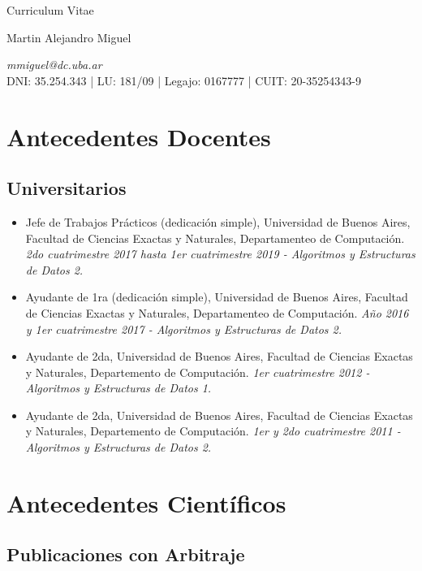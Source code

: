 \documentclass[a4paper,10pt]{article}
\begin{document}
\begin{center}
    { \Huge
    Curriculum Vitae}
\bigskip

{\Large Martin Alejandro Miguel} \\
\medskip

\emph{mmiguel@dc.uba.ar} \\
DNI: 35.254.343 | LU: 181/09 | Legajo: 0167777 | CUIT: 20-35254343-9
\end{center}


\section{Antecedentes Docentes}

\subsection{Universitarios}

\begin{itemize}
    \item Jefe de Trabajos Prácticos (dedicación simple), Universidad de Buenos
        Aires, Facultad de Ciencias Exactas y Naturales, Departamenteo de
        Computación. \emph{2do cuatrimestre 2017 hasta 1er cuatrimestre 2019 -
        Algoritmos y Estructuras de Datos 2.}
    \item Ayudante de 1ra (dedicación simple), Universidad de Buenos Aires,
        Facultad de Ciencias Exactas y Naturales, Departamenteo de Computación.
        \emph{Año 2016 y 1er cuatrimestre 2017 - Algoritmos y Estructuras de
        Datos 2.}
    \item Ayudante de 2da, Universidad de Buenos Aires, Facultad de Ciencias
        Exactas y Naturales, Departemento de Computación. \emph{1er
        cuatrimestre 2012 - Algoritmos y Estructuras de Datos 1.}
    \item Ayudante de 2da, Universidad de Buenos Aires, Facultad de Ciencias
        Exactas y Naturales, Departemento de Computación. \emph{1er y 2do
        cuatrimestre 2011 - Algoritmos y Estructuras de Datos 2.}
\end{itemize}

\section{Antecedentes Científicos}

\subsection{Publicaciones con Arbitraje}
\end{document}
